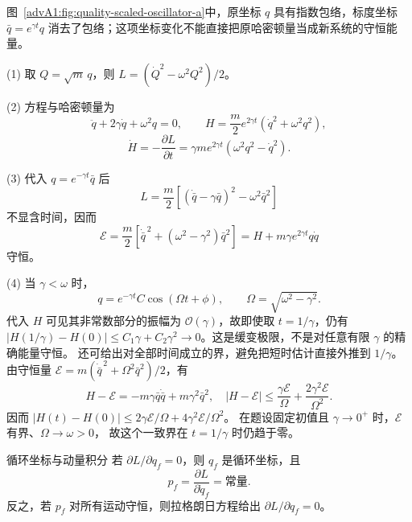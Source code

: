 \begin{advsolution}
\begin{qualityfigure}
\label{advA1:fig:quality-scaled-oscillator-a}
\end{qualityfigure}
图~\ref{advA1:fig:quality-scaled-oscillator-a}中，原坐标 $q$ 具有指数包络，标度坐标 $\bar q=e^{\gamma t}q$ 消去了包络；这项坐标变化不能直接把原哈密顿量当成新系统的守恒能量。

(1) 取 $Q=\sqrt m\,q$，则
$L=(\dot Q^2-\omega^2Q^2)/2$。

(2) 方程与哈密顿量为
\[
 \ddot q+2\gamma\dot q+\omega^2q=0,
 \qquad H=\frac m2e^{2\gamma t}(\dot q^2+\omega^2q^2),
\]
\[
 \dot H=-\frac{\partial L}{\partial t}
 =\gamma me^{2\gamma t}(\omega^2q^2-\dot q^2).
\]

(3) 代入 $q=e^{-\gamma t}\bar q$ 后
\[
 L=\frac m2[(\dot{\bar q}-\gamma\bar q)^2-\omega^2\bar q^2]
\]
不显含时间，因而
\[
 \mathcal E=\frac m2[\dot{\bar q}^{\,2}+(\omega^2-\gamma^2)\bar q^2]
 =H+m\gamma e^{2\gamma t}q\dot q
\]
守恒。

(4) 当 $\gamma<\omega$ 时，
\[
 q=e^{-\gamma t}C\cos(\Omega t+\phi),
 \qquad \Omega=\sqrt{\omega^2-\gamma^2}.
\]
代入 $H$ 可见其非常数部分的振幅为 $\mathcal O(\gamma)$，故即使取
$t=1/\gamma$，仍有
$|H(1/\gamma)-H(0)|\le C_1\gamma+C_2\gamma^2\to0$。这是缓变极限，不是对任意有限 $\gamma$ 的精确能量守恒。
还可给出对全部时间成立的界，避免把短时估计直接外推到 $1/\gamma$。
由守恒量 $\mathcal E=m(\dot{\bar q}^{\,2}+\Omega^2\bar q^2)/2$，有
\[
 H-\mathcal E=-m\gamma\bar q\dot{\bar q}+m\gamma^2\bar q^2,
 \quad |H-\mathcal E|\le\frac{\gamma\mathcal E}{\Omega}
 +\frac{2\gamma^2\mathcal E}{\Omega^2}.
\]
因而 $|H(t)-H(0)|\le2\gamma\mathcal E/\Omega+4\gamma^2\mathcal E/\Omega^2$。
在题设固定初值且 $\gamma\to0^+$ 时，$\mathcal E$ 有界、$\Omega\to\omega>0$，
故这个一致界在 $t=1/\gamma$ 时仍趋于零。

\end{advsolution}

\begin{advtheorem}{循环坐标与动量积分}\label{advA1:thm:cyclic}
若 $\partial L/\partial q_f=0$，则 $q_f$ 是循环坐标，且
\[
 p_f=\frac{\partial L}{\partial\dot q_f}=\text{常量}.
\]
反之，若 $p_f$ 对所有运动守恒，则拉格朗日方程给出 $\partial L/\partial q_f=0$。
\end{advtheorem}

